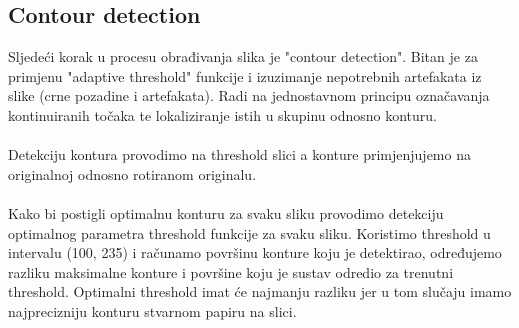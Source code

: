 \documentclass{article}
\begin{document}
\subsection{Contour detection}
Sljedeći korak u procesu obrađivanja slika je "contour detection". Bitan je za primjenu "adaptive threshold" funkcije i izuzimanje nepotrebnih artefakata iz slike (crne pozadine i artefakata). Radi na jednostavnom principu označavanja kontinuiranih točaka te lokaliziranje istih u skupinu odnosno konturu.\\ \\
Detekciju kontura provodimo na threshold slici a konture primjenjujemo na originalnoj odnosno rotiranom originalu.\\ %
\\
Kako bi postigli optimalnu konturu za svaku sliku provodimo detekciju optimalnog parametra threshold funkcije za svaku sliku.
Koristimo threshold u intervalu (100, 235) i računamo površinu konture koju je detektirao, određujemo razliku maksimalne konture i površine koju je sustav odredio za trenutni threshold. Optimalni threshold imat će najmanju razliku jer u tom slučaju imamo najprecizniju konturu stvarnom papiru na slici.
\newline
\end{document}
